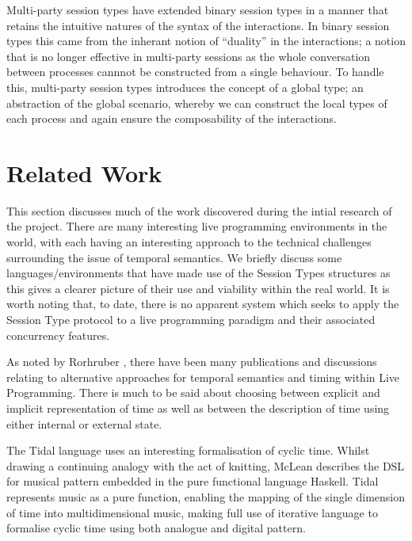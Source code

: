 \documentclass[11pt, abstracton, twoside]{scrartcl}
\begin{document}
Multi-party session types have extended binary session types in a manner
that retains the intuitive natures of the syntax of the interactions. In
binary session types this came from the inherant notion of ``duality'' in
the interactions; a notion that is no longer effective in multi-party 
sessions as the whole conversation between processes cannnot be constructed
from a single behaviour. To handle this, multi-party session types
introduces the concept of a global type; an abstraction of the global
scenario, whereby we can construct the local types of each process and
again ensure the composability of the interactions\cite{HYC08}. 
\newpage

\section{Related Work}
\thispagestyle{empty}
This section discusses much of the work discovered during the intial research 
of the project. There are many interesting live programming environments in
the world, with each having an interesting approach to the technical 
challenges surrounding the issue of temporal semantics. We briefly discuss 
some languages/environments that have made use of the Session Types structures 
as this gives a clearer picture of their use and 
viability within the real world. It is worth noting that, to date, there is no 
apparent system which seeks to apply the Session Type protocol to a live 
programming paradigm and their associated concurrency features.

As noted by Rorhruber \cite{BMNR14}, there have been many publications and 
discussions relating to alternative approaches for temporal semantics and 
timing within Live Programming. There is much to be said about choosing 
between explicit and implicit representation of time as well as between the 
description of time using either internal or external state.

The Tidal language \cite{McL13} uses an interesting formalisation of cyclic 
time. Whilst drawing a continuing analogy with the act of knitting, McLean 
describes the DSL for musical pattern embedded in the pure functional language 
Haskell. Tidal represents music as a pure function, enabling the mapping of 
the single dimension of time into multidimensional music, making full use of 
iterative language to formalise cyclic time using both analogue and digital 
pattern.
\end{document}
